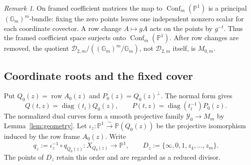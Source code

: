 \documentclass[11pt]{article}
\newcommand{\PP}{\mathbb P}
\newcommand{\Gm}{\mathbb G_m}
\newcommand{\Conf}{\operatorname{Conf}}
\newcommand{\D}{\mathcal D}
\newcommand{\cY}{\mathcal Y}
\theoremstyle{plain}
\theoremstyle{definition}
\theoremstyle{remark}
\newtheorem{remark}[theorem]{Remark}
\numberwithin{equation}{section}
\begin{document}
\begin{remark}
On framed coefficient matrices the map to \(\Conf_m(\PP^1)\)
is a principal \((\Gm)^m\)-bundle: fixing the zero points leaves
one independent nonzero scalar for each coordinate covector.
A row change \(A\mapsto gA\) acts on the points by \(g^{-t}\).
Thus the framed coefficient space surjects onto
\(\Conf_m(\PP^1)\).  After row changes are removed, the quotient
\(\D_{2,m}/((\Gm)^m/\Gm)\), not \(\D_{2,m}\) itself, is \(M_{0,m}\).
\end{remark}

\subsection{Coordinate roots and the fixed cover}
Put \(Q_0(z)=\operatorname{row}A_0(z)\) and
\(P_0(z)=Q_0(z)^\perp\).  The normal form gives
\[
 Q(t,z)=\operatorname{diag}(t_i)Q_0(z),\qquad
 P(t,z)=\operatorname{diag}(t_i^{-1})P_0(z).
\]
The normalized dual curves form a smooth projective family
\(\cY_0\to M_m\) by Lemma~\ref{lem:geometry}.
Let \(\iota_z:\PP^1\xrightarrow{\sim}\PP(Q_0(z))\) be the
projective isomorphism induced by the row frame \(A_0(z)\).
Write
\[
 q_z:=\iota_z^{-1}\circ q_{Q_0(z)}:X_{Q_0(z)}\longrightarrow\PP^1,
 \qquad D_z:=\{\infty,0,1,z_4,\ldots,z_m\}.
\]
The points of \(D_z\) retain this order and are regarded as a
reduced divisor.
\end{document}
